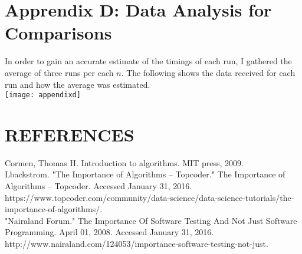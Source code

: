 \documentclass[12pt]{article}
\begin{document}
\hrulefill 

\pagebreak

\section*{Apprendix D: Data Analysis for Comparisons}
In order to gain an accurate estimate of the timings of each run, I gathered the average of three runs per each $n$. The following shows the data received for each run and how the average was estimated.\\
\texttt{[image: appendixd]}
\pagebreak
\section*{REFERENCES}

Cormen, Thomas H. Introduction to algorithms. MIT press, 2009.\\

Lbackstrom. "The Importance of Algorithms – Topcoder." The Importance of Algorithms – Topcoder. Accessed January 31, 2016. https://www.topcoder.com/community/data-science/data-science-tutorials/the-importance-of-algorithms/.\\

"Nairaland Forum." The Importance Of Software Testing And Not Just Software Programming. April 01, 2008. Accessed January 31, 2016. http://www.nairaland.com/124053/importance-software-testing-not-just.
\end{document}
